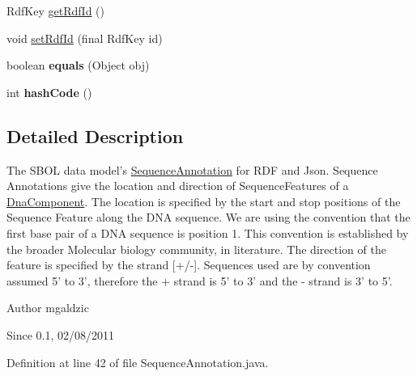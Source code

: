 \begin{DoxyCompactItemize}
RdfKey \hyperlink{classorg_1_1sbolstandard_1_1lib_s_b_o_lj_1_1_sequence_annotation_a98d34c30847c78a8922be878a2fa4d49}{getRdfId} ()
\item 
void \hyperlink{classorg_1_1sbolstandard_1_1lib_s_b_o_lj_1_1_sequence_annotation_afe8d2a1ced8871ba217ddf364366da99}{setRdfId} (final RdfKey id)
\item 
\hypertarget{classorg_1_1sbolstandard_1_1lib_s_b_o_lj_1_1_sequence_annotation_ae3ce8ca5a04e8966a9d2158aeeecfc16}{
boolean {\bfseries equals} (Object obj)}
\label{classorg_1_1sbolstandard_1_1lib_s_b_o_lj_1_1_sequence_annotation_ae3ce8ca5a04e8966a9d2158aeeecfc16}

\item 
\hypertarget{classorg_1_1sbolstandard_1_1lib_s_b_o_lj_1_1_sequence_annotation_a077e18fe97323c7194e2665ffc766399}{
int {\bfseries hashCode} ()}
\label{classorg_1_1sbolstandard_1_1lib_s_b_o_lj_1_1_sequence_annotation_a077e18fe97323c7194e2665ffc766399}

\end{DoxyCompactItemize}


\subsection{Detailed Description}
The SBOL data model's \hyperlink{classorg_1_1sbolstandard_1_1lib_s_b_o_lj_1_1_sequence_annotation}{SequenceAnnotation} for RDF and Json. Sequence Annotations give the location and direction of SequenceFeatures of a \hyperlink{classorg_1_1sbolstandard_1_1lib_s_b_o_lj_1_1_dna_component}{DnaComponent}. The location is specified by the start and stop positions of the Sequence Feature along the DNA sequence. We are using the convention that the first base pair of a DNA sequence is position 1. This convention is established by the broader Molecular biology community, in literature. The direction of the feature is specified by the strand \mbox{[}+/-\/\mbox{]}. Sequences used are by convention assumed 5' to 3', therefore the {\ttfamily +} strand is 5' to 3' and the {\ttfamily -\/} strand is 3' to 5'.

\begin{DoxyAuthor}{Author}
mgaldzic 
\end{DoxyAuthor}
\begin{DoxySince}{Since}
0.1, 02/08/2011 
\end{DoxySince}


Definition at line 42 of file SequenceAnnotation.java.



